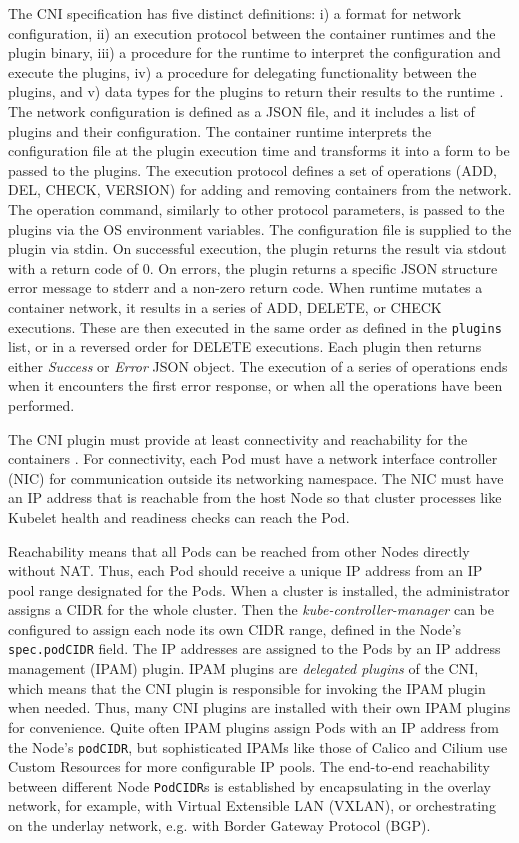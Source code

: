 \documentclass[english, 12pt, a4paper, sci, utf8, a-2b, online]{aaltothesis}
\begin{document}
The CNI specification has five distinct definitions: i) a format for network configuration, ii) an execution protocol between the container runtimes and the plugin binary, iii) a procedure for the runtime to interpret the configuration and execute the plugins, iv) a procedure for delegating functionality between the plugins, and v) data types for the plugins to return their results to the runtime \cite{cni}.
The network configuration is defined as a JSON file, and it includes a list of plugins and their configuration.
The container runtime interprets the configuration file at the plugin execution time and transforms it into a form to be passed to the plugins.
The execution protocol defines a set of operations (ADD, DEL, CHECK, VERSION) for adding and removing containers from the network.
The operation command, similarly to other protocol parameters, is passed to the plugins via the OS environment variables.
The configuration file is supplied to the plugin via stdin.
On successful execution, the plugin returns the result via stdout with a return code of 0.
On errors, the plugin returns a specific JSON structure error message to stderr and a non-zero return code.
When runtime mutates a container network, it results in a series of ADD, DELETE, or CHECK executions.
These are then executed in the same order as defined in the \lstinline{plugins} list, or in a reversed order for DELETE executions.
Each plugin then returns either \emph{Success} or \emph{Error} JSON object.
The execution of a series of operations ends when it encounters the first error response, or when all the operations have been performed.

The CNI plugin must provide at least connectivity and reachability for the containers \cite{cni-tkng}.
For connectivity, each Pod must have a network interface controller (NIC) for communication outside its networking namespace.
The NIC must have an IP address that is reachable from the host Node so that cluster processes like Kubelet health and readiness checks can reach the Pod.

Reachability means that all Pods can be reached from other Nodes directly without NAT.
Thus, each Pod should receive a unique IP address from an IP pool range designated for the Pods.
When a cluster is installed, the administrator assigns a CIDR for the whole cluster.
Then the \emph{kube-controller-manager} can be configured to assign each node its own CIDR range, defined in the Node's \lstinline{spec.podCIDR} field.
The IP addresses are assigned to the Pods by an IP address management (IPAM) plugin.
IPAM plugins are \emph{delegated plugins} of the CNI, which means that the CNI plugin is responsible for invoking the IPAM plugin when needed.
Thus, many CNI plugins are installed with their own IPAM plugins for convenience.
Quite often IPAM plugins assign Pods with an IP address from the Node's \lstinline{podCIDR}, but sophisticated IPAMs like those of Calico and Cilium use Custom Resources for more configurable IP pools.
The end-to-end reachability between different Node \lstinline{PodCIDR}s is established by encapsulating in the overlay network, for example, with Virtual Extensible LAN (VXLAN), or orchestrating on the underlay network, e.g. with Border Gateway Protocol (BGP).
\end{document}
